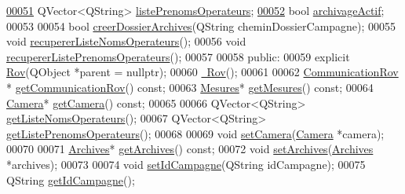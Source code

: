 \begin{DoxyCode}
\hyperlink{class_rov_a1e059749c13ed4ee9c0ec9168e79a3be}{00051}         QVector<QString> \hyperlink{class_rov_a1e059749c13ed4ee9c0ec9168e79a3be}{listePrenomsOperateurs}; 
\hyperlink{class_rov_a659da5fe3636356b006a8e08a8433dd3}{00052}         \textcolor{keywordtype}{bool} \hyperlink{class_rov_a659da5fe3636356b006a8e08a8433dd3}{archivageActif};                     
00053 
00054         \textcolor{keywordtype}{bool} \hyperlink{class_rov_a53f656be57fa1eb7b93e03095a597439}{creerDossierArchives}(QString cheminDossierCampagne);
00055         \textcolor{keywordtype}{void} \hyperlink{class_rov_a490eefb90bf28e83f181d770f0f52446}{recupererListeNomsOperateurs}();
00056         \textcolor{keywordtype}{void} \hyperlink{class_rov_a84dece742f5c4c903ada4f25c869597f}{recupererListePrenomsOperateurs}();
00057 
00058     \textcolor{keyword}{public}:
00059         \textcolor{keyword}{explicit} \hyperlink{class_rov_a5dddd3bd156c134848078296087d090c}{Rov}(QObject *parent = \textcolor{keyword}{nullptr}); 
00060         \hyperlink{class_rov_a6e41f712195b9af74fd75b781745d1b5}{~Rov}();                                  
00061 
00062         \hyperlink{class_communication_rov}{CommunicationRov} * \hyperlink{class_rov_ad30543625f584e28bf785a80c59506dc}{getCommunicationRov}() \textcolor{keyword}{const}; 
00063         \hyperlink{class_mesures}{Mesures}* \hyperlink{class_rov_a0edd5f7db785bd856b8723fe49ca7848}{getMesures}() \textcolor{keyword}{const};                    
00064         \hyperlink{class_camera}{Camera}* \hyperlink{class_rov_aae07e8ca2c4b3be6a0a378b6f072c60b}{getCamera}() \textcolor{keyword}{const};                      
00065 
00066         QVector<QString> \hyperlink{class_rov_ab585cb1f82344ba0a64a28488910b262}{getListeNomsOperateurs}();
00067         QVector<QString> \hyperlink{class_rov_a128cae6dc19025017dea26663adde765}{getListePrenomsOperateurs}();
00068 
00069         \textcolor{keywordtype}{void} \hyperlink{class_rov_a0eba2119b89406948976ae92781c4629}{setCamera}(\hyperlink{class_camera}{Camera} *camera);
00070 
00071         \hyperlink{class_archives}{Archives}* \hyperlink{class_rov_af0936fd10d04851d53f28575ecd1da3f}{getArchives}() \textcolor{keyword}{const};
00072         \textcolor{keywordtype}{void} \hyperlink{class_rov_acb3ecbb04ace455526206d3c05b712fd}{setArchives}(\hyperlink{class_archives}{Archives} *archives);
00073 
00074         \textcolor{keywordtype}{void} \hyperlink{class_rov_a9bbaec4a59dae307440bfeefbc56190b}{setIdCampagne}(QString idCampagne); 
00075         QString \hyperlink{class_rov_aaf98d93ef9b164a2e1766494d9577b57}{getIdCampagne}(); 

\end{DoxyCode}
